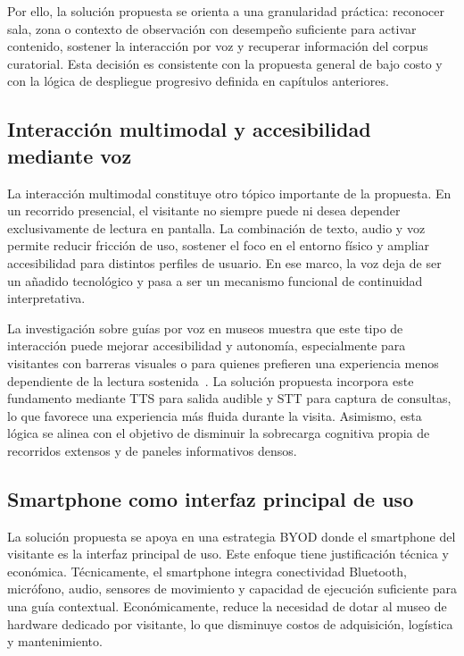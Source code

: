 Por ello, la solución propuesta se orienta a una granularidad pr\'actica: reconocer sala, zona o contexto de observaci\'on con desempe\~no suficiente para activar contenido, sostener la interacci\'on por voz y recuperar informaci\'on del corpus curatorial. Esta decisi\'on es consistente con la propuesta general de bajo costo y con la l\'ogica de despliegue progresivo definida en cap\'itulos anteriores.

\subsection{Interacci\'on multimodal y accesibilidad mediante voz}

La interacci\'on multimodal constituye otro t\'opico importante de la propuesta. En un recorrido presencial, el visitante no siempre puede ni desea depender exclusivamente de lectura en pantalla. La combinaci\'on de texto, audio y voz permite reducir fricci\'on de uso, sostener el foco en el entorno f\'isico y ampliar accesibilidad para distintos perfiles de usuario. En ese marco, la voz deja de ser un a\~nadido tecnol\'ogico y pasa a ser un mecanismo funcional de continuidad interpretativa.

La investigaci\'on sobre gu\'ias por voz en museos muestra que este tipo de interacci\'on puede mejorar accesibilidad y autonom\'ia, especialmente para visitantes con barreras visuales o para quienes prefieren una experiencia menos dependiente de la lectura sostenida~\cite{wang2024voiceguide}. La solución propuesta incorpora este fundamento mediante TTS para salida audible y STT para captura de consultas, lo que favorece una experiencia m\'as fluida durante la visita. Asimismo, esta l\'ogica se alinea con el objetivo de disminuir la sobrecarga cognitiva propia de recorridos extensos y de paneles informativos densos.

\subsection{Smartphone como interfaz principal de uso}

La solución propuesta se apoya en una estrategia BYOD donde el smartphone del visitante es la interfaz principal de uso. Este enfoque tiene justificaci\'on t\'ecnica y econ\'omica. T\'ecnicamente, el smartphone integra conectividad Bluetooth, micr\'ofono, audio, sensores de movimiento y capacidad de ejecuci\'on suficiente para una gu\'ia contextual. Econ\'omicamente, reduce la necesidad de dotar al museo de hardware dedicado por visitante, lo que disminuye costos de adquisici\'on, log\'istica y mantenimiento.

